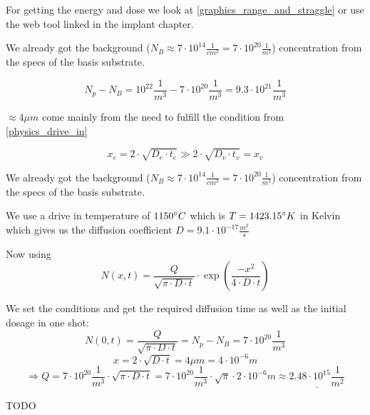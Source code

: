 For getting the energy and dose we look at \autoref{graphics_range_and_straggle} or use the web tool linked in the implant chapter.

We already got the background ($N_B \approx 7 \cdot 10^{14} \frac{1}{cm^3}=7 \cdot 10^{20} \frac{1}{m^3}$) concentration from the specs of the basis substrate.

\begin{equation}
N_p - N_B = 10^{22}\frac{1}{m^3} - 7 \cdot 10^{20} \frac{1}{m^3} = 9.3 \cdot 10^{21} \frac{1}{m^3}
\end{equation}


$\approx 4 \mu m$ come mainly from the need to fulfill the condition from \autoref{physics_drive_in}

\begin{equation}
x_e = 2 \cdot \sqrt{D_e \cdot t_e} \gg 2 \cdot \sqrt{D_v \cdot t_v} = x_v
\end{equation}

We already got the background ($N_B \approx 7 \cdot 10^{14} \frac{1}{cm^3}=7 \cdot 10^{20} \frac{1}{m^3}$) concentration from the specs of the basis substrate.

We use a drive in temperature of $1150 \degree C$ which is  $T = 1423.15 \degree K$ in Kelvin which gives us the diffusion coefficient $D=9.1 \cdot 10^{-17}  \frac{m^2}{s}$

Now using
\begin{equation}
N(x,t)
=
\frac{Q}{\sqrt{\pi\cdot D \cdot t}} \cdot \exp\left(\frac{-x^2}{4 \cdot D \cdot t}\right)
\end{equation}

We set the conditions and get the required diffusion time as well as the initial dosage in one shot:
\begin{equation}
N(0,t)
=
\frac{Q}{\sqrt{\pi\cdot D \cdot t}}
=
N_p-N_B
=
7 \cdot 10^{20} \frac{1}{m^3}
\end{equation}
\begin{equation}
x
=
2 \cdot \sqrt{D \cdot t}
=
4 \mu m
=
4 \cdot 10^{-6} m
\end{equation}
\begin{equation}
\Rightarrow
Q
=
7 \cdot 10^{20} \frac{1}{m^3} \cdot \sqrt{\pi\cdot D \cdot t}
=
7 \cdot 10^{20} \frac{1}{m^3} \cdot \sqrt{\pi} \cdot 2 \cdot 10^{-6} m
\approx
\underline{2.48 \cdot 10^{15} \frac{1}{m^2}}
\end{equation}

TODO